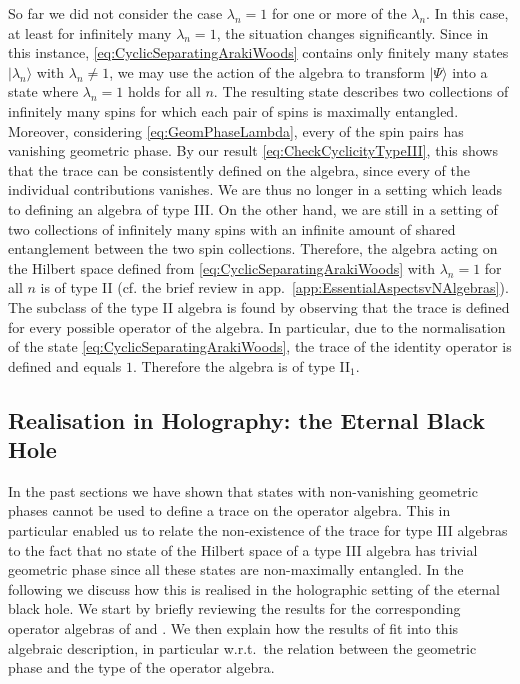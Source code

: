 \documentclass[a4paper,11pt]{article}
\newcommand{\1}{\mathds{1}}
\begin{document}
So far we did not consider the case $\lambda_n=1$ for one or more of the $\lambda_n$. In this case, at least for infinitely many $\lambda_n=1$, the situation changes significantly. Since in this instance, \eqref{eq:CyclicSeparatingArakiWoods} contains only finitely many states $|\lambda_n\rangle$ with $\lambda_n\neq1$, we may use the action of the algebra to transform $|\Psi\rangle$ into a state where $\lambda_n=1$ holds for all $n$. The resulting state describes two collections of infinitely many spins for which each pair of spins is maximally entangled. Moreover, considering \eqref{eq:GeomPhaseLambda}, every of the spin pairs has vanishing geometric phase. By our result \eqref{eq:CheckCyclicityTypeIII}, this shows that the trace can be consistently defined on the algebra, since every of the individual contributions vanishes. We are thus no longer in a setting which leads to defining an algebra of type III. On the other hand, we are still in a setting of two collections of infinitely many spins with an infinite amount of shared entanglement between the two spin collections. Therefore, the algebra acting on the Hilbert space defined from \eqref{eq:CyclicSeparatingArakiWoods} with $\lambda_n=1$ for all $n$ is of type II (cf. the brief review in app.~\ref{app:EssentialAspectsvNAlgebras}). The subclass of the type II algebra is found by observing that the trace is defined for every possible operator of the algebra. In particular, due to the normalisation of the state \eqref{eq:CyclicSeparatingArakiWoods}, the trace of the identity operator is defined and equals $1$. Therefore the algebra is of type II$_1$.

\subsection{Realisation in Holography: the Eternal Black Hole}
\label{sec:RealInHol}

In the past sections we have shown that states with non-vanishing geometric phases cannot be used to define a trace on the operator algebra. This in particular enabled us to relate the non-existence of the trace for type III algebras to the fact that no state of the Hilbert space of a type III algebra has trivial geometric phase since all these states are non-maximally entangled. In the following we discuss how this is realised in the holographic setting of the eternal black hole. We start by briefly reviewing the results for the corresponding operator algebras of \cite{Leutheusser:2021frk,Leutheusser:2021qhd} and \cite{Witten:2021unn}. We then explain how the results of \cite{Nogueira:2021ngh,Banerjee:2022jnv} fit into this algebraic description, in particular w.r.t.~the relation between the geometric phase and the type of the operator algebra.
\end{document}
